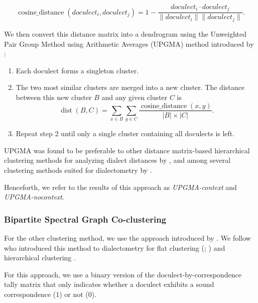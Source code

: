 \documentclass[a4paper]{article}
\begin{document}
\begin{equation*}
\operatorname{cosine\_distance}(doculect_i,doculect_j) =
1 -
\frac{doculect_i \cdot doculect_j}{\lVert doculect_i \rVert \lVert doculect_j \rVert}
.
\end{equation*}

We then convert this distance matrix into a dendrogram using the
Unweighted Pair Group Method using Arithmetic Averages
(UPGMA) method introduced by \citet{sokal1958statistical}:

\begin{enumerate}
\item
Each doculect forms a singleton cluster.

\item
The two most similar clusters are merged into a new cluster.
The distance between this new cluster $B$ and any given cluster $C$ is
\begin{equation*}
\operatorname{dist}(B, C) =
\sum_{x \in B}
\sum_{y \in C}
\frac{
\operatorname{cosine\_distance}(x, y)
}
{
|B| \times |C|
}
.
\end{equation*}

\item
Repeat step 2 until only a single cluster containing all doculects is left.
\end{enumerate}

UPGMA was found to be preferable to other
distance matrix-based hierarchical clustering methods
for analyzing dialect distances by \citet[p. 153]{heeringa2004measuring},
and among several clustering methods suited for dialectometry
by \citet{prokic2008recognizing}.

Henceforth, we refer to the results of this approach
as \textit{UPGMA-context} and \textit{UPGMA-nocontext}.

\subsubsection{Bipartite Spectral Graph Co-clustering}
\label{subsubsec:bsgc}

For the other clustering method, we use the approach
introduced by \citet{dhillon2001co-clustering}.
We follow \citeauthor*{wieling2009bipartite} who introduced
this method to dialectometry for flat clustering (\citeyear{wieling2009bipartite}; \citeyear{wieling2011bipartite}) and hierarchical clustering \citeyearpar{wieling2010hierarchical}.

For this approach, we use a binary version of the
doculect-by-correspondence tally matrix that only
indicates whether a doculect exhibits
a sound correspondence ($1$) or not ($0$).
\end{document}
